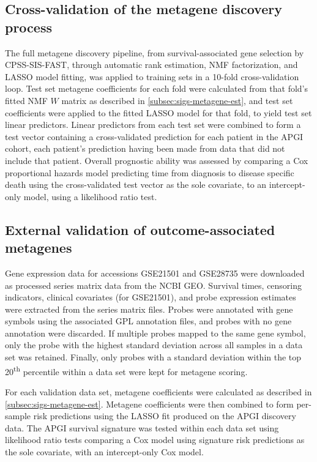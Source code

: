 \documentclass[dissertation.tex]{subfiles}
\begin{document}
\subsection{Cross-validation of the metagene discovery process}
The full metagene discovery pipeline, from survival-associated gene selection by \gls{CPSS}-\gls{SIS}-\gls{FAST}, through automatic rank estimation, \gls{NMF} factorization, and \gls{LASSO} model fitting, was applied to training sets in a 10-fold cross-validation loop.  Test set metagene coefficients for each fold were calculated from that fold's fitted \gls{NMF} $W$ matrix as described in \cref{subsec:sigs-metagene-est}, and test set coefficients were applied to the fitted \gls{LASSO} model for that fold, to yield test set linear predictors.  Linear predictors from each test set were combined to form a test vector containing a cross-validated prediction for each patient in the \gls{APGI} cohort, each patient's prediction having been made from data that did not include that patient.  Overall prognostic ability was assessed by comparing a Cox proportional hazards model predicting time from diagnosis to disease specific death using the cross-validated test vector as the sole covariate, to an intercept-only model, using a likelihood ratio test.

\subsection{External validation of outcome-associated metagenes}
Gene expression data for accessions GSE21501 and GSE28735 were downloaded as processed series matrix data from the \gls{NCBI} \gls{GEO}.  Survival times, censoring indicators, clinical covariates (for GSE21501), and probe expression estimates were extracted from the series matrix files.  Probes were annotated with gene symbols using the associated GPL annotation files, and probes with no gene annotation were discarded.  If multiple probes mapped to the same gene symbol, only the probe with the highest standard deviation across all samples in a data set was retained.  Finally, only probes with a standard deviation within the top 20\textsuperscript{th} percentile within a data set were kept for metagene scoring.

For each validation data set, metagene coefficients were calculated as described in \cref{subsec:sigs-metagene-est}.  Metagene coefficients were then combined to form per-sample risk predictions using the \gls{LASSO} fit produced on the \gls{APGI} discovery data.  The \gls{APGI} survival signature was tested within each data set using likelihood ratio tests comparing a Cox model using signature risk predictions as the sole covariate, with an intercept-only Cox model.
\end{document}
